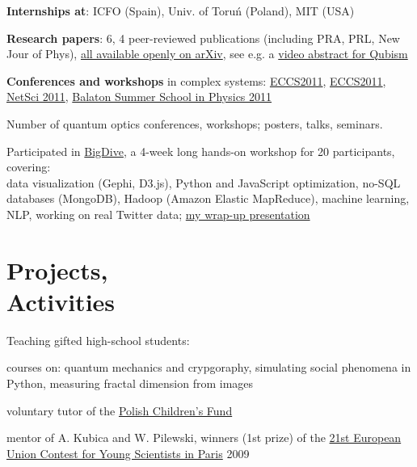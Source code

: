 \documentclass[margin,line]{resume}
\begin{document}
\begin{resume}
\begin{list2}
    \item {\bf Internships at}: ICFO (Spain), Univ. of Toruń (Poland), MIT (USA)
    
    \item {\bf Research papers}: 6, 4 peer-reviewed publications (including PRA, PRL, New Jour of Phys), \href{http://arxiv.org/a/migdal\_p\_1}{all available openly on arXiv}, see e.g. a \href{http://www.youtube.com/watch?v=8fPAzOziTZo}{video abstract for Qubism}

    \item {\bf Conferences and workshops} in complex systems: \href{http://www.eccs2012.eu/}{ECCS2011}, \href{http://www.eccs2011.eu/}{ECCS2011}, \href{http://netsci2011.net/}{NetSci 2011}, \href{http://bss.mafihe.hu/}{Balaton Summer School in Physics 2011}

    \item [Number of quantum optics conferences, workshops; posters, talks, seminars.]

    \item Participated in \href{http://bigvide.eu}{BigDive}, a 4-week long hands-on workshop for 20 participants, covering:\\
        data visualization (Gephi, D3.js), Python and JavaScript optimization, no-SQL databases (MongoDB), Hadoop (Amazon Elastic MapReduce), machine learning, NLP, working on real Twitter data; \href{https://speakerdeck.com/pmigdal/a-map-of-256-tags-of-stackoverflow-at-bigdive-wrap-up}{my wrap-up presentation} 
    \end{list2}


\vspace{3mm}


    \section{\mysidestyle Projects,\\Activities}
    Teaching gifted high-school students:
    \begin{list2}
        \item courses on: quantum mechanics and crypgoraphy, simulating social phenomena in Python, measuring fractal dimension from images
        \item voluntary tutor of the \href{http://www.fundusz.org/?lang=gb}{Polish Children's Fund} 
        \item mentor of A. Kubica and W. Pilewski, winners (1st prize) of the \href{http://www.eucys09.fr/}{21st European Union Contest for Young Scientists in Paris}  \hfill 2009
    \end{list2} 


\end{resume}
\end{document}
